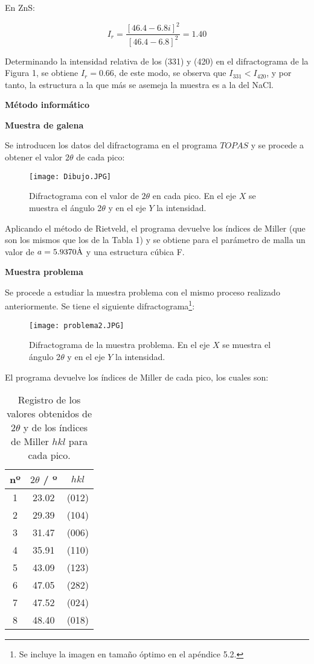 \documentclass[a4paper,twocolumn,10pt]{article}
\begin{document}
En ZnS:

$$
I_r = \frac{ [46.4 - 6.8i]^2}{[46.4 - 6.8]^2} = 1.40
$$

Determinando la intensidad relativa de los (331) y (420) en el difractograma de la Figura 1, se obtiene $I_r = 0.66$, de este modo, se observa que $I_{331} < I_{420}$, y por tanto, la estructura a la que más se asemeja la muestra es a la del NaCl.

\textbf{Método informático}

\textbf{\small Muestra de galena}

Se introducen los datos del difractograma en el programa $TOPAS$ y se procede a obtener el valor $2\theta$ de cada pico:

\begin{figure}[H]
\centering
\texttt{[image: Dibujo.JPG]}
\caption{Difractograma con el valor de $2\theta$ en cada pico. En el eje $X$ se muestra el ángulo 2$\theta$ y en el eje $Y$ la intensidad.} 
\label{Figura 1:Dibujo}
\end{figure}

 Aplicando el método de Rietveld, el programa devuelve los índices de Miller (que son los mismos que los de la Tabla 1) y se obtiene para el parámetro de malla un valor de $a = 5.9370 \rm \dot{A}$ y una estructura cúbica F.
 
 \textbf{\small Muestra problema}
 
 Se procede a estudiar la muestra problema con el mismo proceso realizado anteriormente. Se tiene el siguiente difractograma\footnote{Se incluye la imagen en tamaño óptimo en el apéndice 5.2.}:
 
 \begin{figure}[H]
\centering
\texttt{[image: problema2.JPG]}
\caption{Difractograma de la muestra problema. En el eje $X$ se muestra el ángulo 2$\theta$ y en el eje $Y$ la intensidad.} 
\label{Figura 1:Dibujo}
\end{figure}


El programa devuelve los índices de Miller de cada pico, los cuales son:

\begin{table}[H]
\caption{ Registro de los valores obtenidos de 2$\theta$ y de los índices de Miller $hkl$ para cada pico.}
\centering
\begin{tabular}{c|c|c|}
nº & $2\theta$ / º & $hkl$
\\\hline 
1 & 23.02 & (012) \\
2 & 29.39 &  (104)\\
3 & 31.47 &  (006)\\
4 & 35.91 &  (110)\\
5 & 43.09 & (123)\\
6 & 47.05 & (282)\\
7 & 47.52 &  (024)\\
8 & 48.40 &  (018)\\

\end{tabular}
\end{table}
\end{document}
